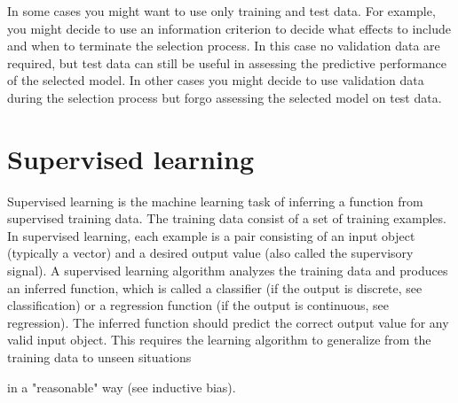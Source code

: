 \documentclass[]{article}
\begin{document}

In some cases you might want to use only training and test data. For example, you might decide to use an information criterion to decide what effects to include and when to terminate the selection process. In this case no validation data are required, but test data can still be useful in assessing the predictive performance of the selected model. In other cases you might decide to use validation data during the selection process but forgo assessing the selected model on test data. 



\section{Supervised learning}


Supervised learning is the machine learning task of inferring a function from supervised training data. The training data consist of a set of training examples. In supervised learning, each example is a pair consisting of an input object (typically a vector) and a desired output value (also called the supervisory signal). A supervised learning algorithm analyzes the training data and produces an inferred function, which is called a classifier (if the output is discrete, see classification) or a regression function (if the output is continuous, see regression). The inferred function should predict the correct output value for any valid input object. This requires the learning algorithm to generalize from the training data to unseen situations 

in a "reasonable" way (see inductive bias). 
\end{document}
